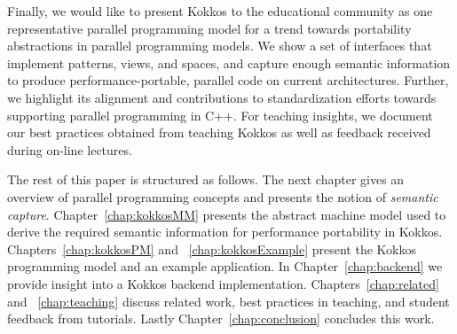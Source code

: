 Finally, we would like to present Kokkos to the educational community as one representative parallel programming model for a trend towards portability abstractions in parallel programming models. We show a set of interfaces that implement patterns, views, and spaces, and capture enough semantic information to produce performance-portable, parallel code on current architectures. Further, we highlight its alignment and contributions to standardization efforts towards supporting parallel programming in C++. For teaching insights, we document our best practices obtained from teaching Kokkos as well as feedback received during on-line lectures.

The rest of this paper is structured as follows. The next chapter gives an overview of parallel programming concepts and presents the notion of \emph{semantic capture}. Chapter~\ref{chap:kokkosMM} presents the abstract machine model used to derive the required semantic information for performance portability in Kokkos. Chapters~\ref{chap:kokkosPM} and ~\ref{chap:kokkosExample} present the Kokkos programming model and an example application. In Chapter~\ref{chap:backend} we provide insight into a Kokkos backend implementation. Chapters~\ref{chap:related} and ~\ref{chap:teaching} discuss related work, best practices in teaching, and student feedback from tutorials. Lastly Chapter~\ref{chap:conclusion} concludes this work.

